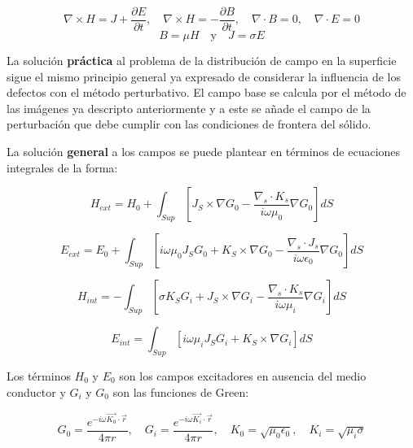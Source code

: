 \begin{equation*}
	\label{eq:530}
	\nabla \times H= J + \dfrac{\partial E}{\partial t}, \quad
	\nabla \times H= - \dfrac{\partial B}{\partial t}, \quad	
	\nabla \cdot  B= 0, \quad
	\nabla \cdot  E= 0
\end{equation*}
\begin{equation*}
	\label{eq:531}
	B=\mu H \quad	\text{y} \quad J=\sigma E
\end{equation*}

La solución \textbf{práctica} al problema de la distribución de campo en la superficie sigue el mismo principio general ya expresado de considerar la influencia de los defectos con el método perturbativo. El campo base se calcula por el método de las imágenes ya descripto anteriormente y a este se añade el campo de la perturbación que debe cumplir con las condiciones de frontera del sólido.

La solución \textbf{general} a los campos se puede plantear en términos de ecuaciones integrales de la forma:

\begin{equation}
	\label{eq:532}
	H_{ext} = H_{0}+\int_{Sup}\left[J_{S}\times\nabla G_{0}-\dfrac{\nabla_{s}\cdot K_{s}}{i\omega\mu_{0}} \nabla G_{0} \right]dS 
\end{equation}

\begin{equation}
	\label{eq:533}
	E_{ext} = E_{0}+\int_{Sup}\left[i\omega\mu_{0}J_{S}G_{0}+K_{S}\times \nabla G_{0}-\dfrac{\nabla_{s}\cdot J_{s}}{i\omega\epsilon_{0}} \nabla G_{0} \right]dS 
\end{equation}

\begin{equation}
	\label{eq:534}
	H_{int} = -\int_{Sup}\left[\sigma K_{S} G_{i}+ J_{S} \times \nabla G_{i}-\dfrac{\nabla_{s}\cdot K_{s}}{i\omega\mu_{i}} \nabla G_{i} \right]dS 
\end{equation}

\begin{equation}
	\label{eq:535}
	E_{int} = \int_{Sup}\left[i\omega\mu_{i}J_{S}G_{i}+K_{S}\times \nabla G_{i} \right]dS 
\end{equation}

Los términos $H_{0}$ y $E_{0}$ son los campos excitadores en ausencia del medio conductor y $G_{i}$ y $G_{0}$ son las funciones de Green:

\begin{equation*}
	\label{eq:536}
	G_{0}=\dfrac{e^{-i\omega \overrightarrow{K_{0}}\cdot \overrightarrow{r}}}{4\pi r}, \quad
	G_{i}=\dfrac{e^{-i\omega \overrightarrow{K_{i}}\cdot \overrightarrow{r}}}{4\pi r}, \quad	
	K_{0}=\sqrt{\mu_{0}\epsilon_{0}}, \quad
	K_{i}=\sqrt{\mu_{i}\sigma}
\end{equation*}


